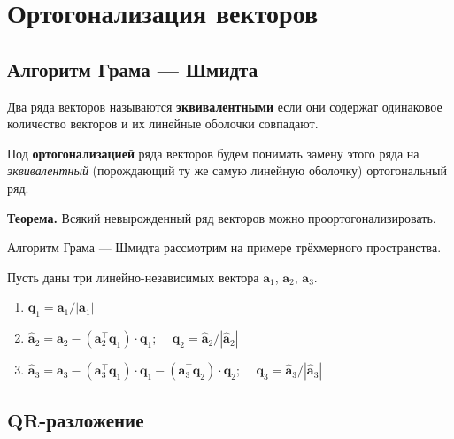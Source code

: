 \documentclass[11pt,a4paper]{article}
\providecommand{\tightlist}{%
      \setlength{\itemsep}{0pt}\setlength{\parskip}{0pt}}
\begin{document}
    \hypertarget{ux43eux440ux442ux43eux433ux43eux43dux430ux43bux438ux437ux430ux446ux438ux44f-ux432ux435ux43aux442ux43eux440ux43eux432}{%
\section{Ортогонализация
векторов}\label{ux43eux440ux442ux43eux433ux43eux43dux430ux43bux438ux437ux430ux446ux438ux44f-ux432ux435ux43aux442ux43eux440ux43eux432}}

\hypertarget{ux430ux43bux433ux43eux440ux438ux442ux43c-ux433ux440ux430ux43cux430-ux448ux43cux438ux434ux442ux430}{%
\subsection{Алгоритм Грама ---
Шмидта}\label{ux430ux43bux433ux43eux440ux438ux442ux43c-ux433ux440ux430ux43cux430-ux448ux43cux438ux434ux442ux430}}

Два ряда векторов называются \textbf{эквивалентными} если они содержат
одинаковое количество векторов и их линейные оболочки совпадают.

Под \textbf{ортогонализацией} ряда векторов будем понимать замену этого
ряда на \emph{эквивалентный} (порождающий ту же самую линейную оболочку)
ортогональный ряд.

\textbf{Теорема.} Всякий невырожденный ряд векторов можно
проортогонализировать.

Алгоритм Грама --- Шмидта рассмотрим на примере трёхмерного
пространства.

Пусть даны три линейно-независимых вектора \(\mathbf{a}_1\),
\(\mathbf{a}_2\), \(\mathbf{a}_3\).

\begin{enumerate}
\def\labelenumi{\arabic{enumi}.}
\tightlist
\item
  \(\mathbf{q}_1 = \mathbf{a}_1 / |\mathbf{a}_1|\)
\item
  \(\mathbf{\hat{a}}_2 = \mathbf{a}_2 - (\mathbf{a}_2^\top \mathbf{q}_1) \cdot \mathbf{q}_1\);
  \(\quad \mathbf{q}_2 = \mathbf{\hat{a}}_2 / |\mathbf{\hat{a}}_2|\)
\item
  \(\mathbf{\hat{a}}_3 = \mathbf{a}_3 - (\mathbf{a}_3^\top \mathbf{q}_1) \cdot \mathbf{q}_1 - (\mathbf{a}_3^\top \mathbf{q}_2) \cdot \mathbf{q}_2\);
  \(\quad \mathbf{q}_3 = \mathbf{\hat{a}}_3/|\mathbf{\hat{a}}_3|\)
\end{enumerate}

    \hypertarget{mathbfqr-ux440ux430ux437ux43bux43eux436ux435ux43dux438ux435}{%
\subsection{\texorpdfstring{\(\mathbf{QR}\)-разложение}{\textbackslash mathbf\{QR\}-разложение}}\label{mathbfqr-ux440ux430ux437ux43bux43eux436ux435ux43dux438ux435}}
\end{document}
